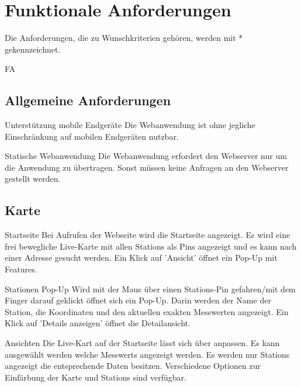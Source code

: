 \section{Funktionale Anforderungen}

\item Die Anforderungen, die zu Wunschkriterien gehören, werden mit * gekennzeichnet.

\setcounter{counter}{10}
\begin{Kriterien}{FA}

\subsection{Allgemeine Anforderungen}

 \item[Unterstützung mobile Endgeräte]
   Die \gls{Webanwendung} ist ohne jegliche Einschränkung auf mobilen Endgeräten nutzbar.  

 \item[Statische Webanwendung]
   Die \gls{Webanwendung} erfordert den \gls{Webserver} nur um die Anwendung zu übertragen.
   Sonst müssen keine Anfragen an den \gls{Webserver} gestellt werden. 

\subsection{Karte}

 \item[Startseite]
   Bei Aufrufen der Webseite wird die Startseite angezeigt.
   Es wird eine frei bewegliche \gls{Live-Karte} mit allen \glspl{Station} als \glspl{Pin} angezeigt und es kann nach einer Adresse gesucht werden.
   Ein Klick auf 'Ansicht' öffnet ein \gls{Pop-Up} mit \glspl{Feature}.

 \item[Stationen Pop-Up]
  Wird mit der Maus über einen Stations-\gls{Pin} gefahren/mit dem Finger darauf geklickt öffnet sich ein \gls{Pop-Up}.
  Darin werden der Name der \gls{Station}, die Koordinaten und den aktuellen exakten Messwerten angezeigt.
  Ein Klick auf 'Details anzeigen' öffnet die \gls{Detailansicht}.

 \item[Ansichten]
   Die \gls{Live-Kart} auf der Startseite lässt sich über  anpassen.
   Es kann ausgewählt werden welche \glspl{Messwert} angezeigt werden.
   Es werden nur \glspl{Station} angezeigt die entsprechende Daten besitzen.
   Verschiedene Optionen zur Einfärbung der Karte und \glspl{Station} sind verfügbar.


\end{Kriterien}
